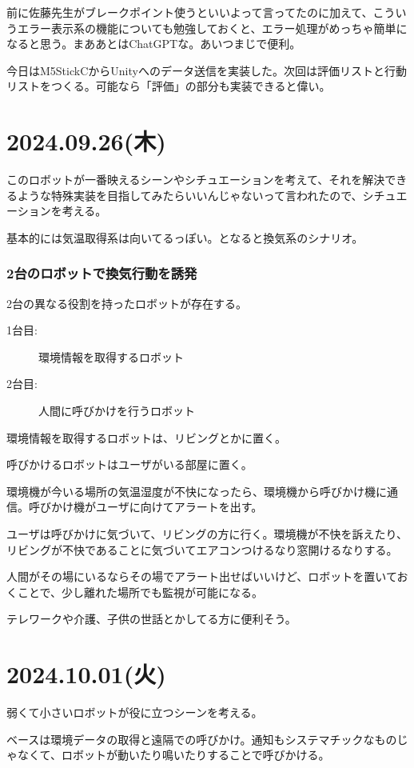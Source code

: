 \documentclass[fleqn,twocolumn]{mynote}
\begin{document}
前に佐藤先生がブレークポイント使うといいよって言ってたのに加えて、こういうエラー表示系の機能についても勉強しておくと、エラー処理がめっちゃ簡単になると思う。まああとはChatGPTな。あいつまじで便利。

今日はM5StickCからUnityへのデータ送信を実装した。次回は評価リストと行動リストをつくる。可能なら「評価」の部分も実装できると偉い。

\section*{2024.09.26(木)}
このロボットが一番映えるシーンやシチュエーションを考えて、それを解決できるような特殊実装を目指してみたらいいんじゃないって言われたので、シチュエーションを考える。

基本的には気温取得系は向いてるっぽい。となると換気系のシナリオ。

\subsubsection*{2台のロボットで換気行動を誘発}
2台の異なる役割を持ったロボットが存在する。
\begin{description}
  \item[1台目:]環境情報を取得するロボット
  \item[2台目:]人間に呼びかけを行うロボット
\end{description}

環境情報を取得するロボットは、リビングとかに置く。

呼びかけるロボットはユーザがいる部屋に置く。

環境機が今いる場所の気温湿度が不快になったら、環境機から呼びかけ機に通信。呼びかけ機がユーザに向けてアラートを出す。

ユーザは呼びかけに気づいて、リビングの方に行く。環境機が不快を訴えたり、リビングが不快であることに気づいてエアコンつけるなり窓開けるなりする。

人間がその場にいるならその場でアラート出せばいいけど、ロボットを置いておくことで、少し離れた場所でも監視が可能になる。

テレワークや介護、子供の世話とかしてる方に便利そう。

\section*{2024.10.01(火)}
弱くて小さいロボットが役に立つシーンを考える。

ベースは環境データの取得と遠隔での呼びかけ。通知もシステマチックなものじゃなくて、ロボットが動いたり鳴いたりすることで呼びかける。
\end{document}

